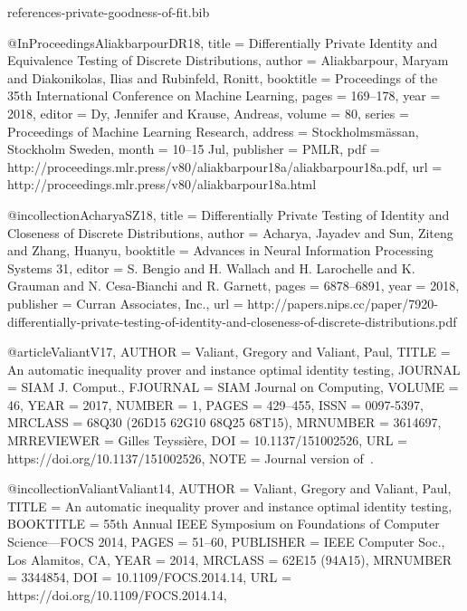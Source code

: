 \documentclass[10pt]{article}
\begin{document}
\begin{filecontents}{references-private-goodness-of-fit.bib}

@InProceedings{AliakbarpourDR18,
  title = 	 {Differentially Private Identity and Equivalence Testing of Discrete Distributions},
  author = 	 {Aliakbarpour, Maryam and Diakonikolas, Ilias and Rubinfeld, Ronitt},
  booktitle = 	 {Proceedings of the 35th International Conference on Machine Learning},
  pages = 	 {169--178},
  year = 	 {2018},
  editor = 	 {Dy, Jennifer and Krause, Andreas},
  volume = 	 {80},
  series = 	 {Proceedings of Machine Learning Research},
  address = 	 {Stockholmsmässan, Stockholm Sweden},
  month = 	 {10--15 Jul},
  publisher = 	 {PMLR},
  pdf = 	 {http://proceedings.mlr.press/v80/aliakbarpour18a/aliakbarpour18a.pdf},
  url = 	 {http://proceedings.mlr.press/v80/aliakbarpour18a.html}
}

@incollection{AcharyaSZ18,
  title = {Differentially Private Testing of Identity and Closeness of Discrete Distributions},
  author = {Acharya, Jayadev and Sun, Ziteng and Zhang, Huanyu},
  booktitle = {Advances in Neural Information Processing Systems 31},
  editor = {S. Bengio and H. Wallach and H. Larochelle and K. Grauman and N. Cesa-Bianchi and R. Garnett},
  pages = {6878--6891},
  year = {2018},
  publisher = {Curran Associates, Inc.},
  url = {http://papers.nips.cc/paper/7920-differentially-private-testing-of-identity-and-closeness-of-discrete-distributions.pdf}
}

@article{ValiantV17,
    AUTHOR = {Valiant, Gregory and Valiant, Paul},
     TITLE = {An automatic inequality prover and instance optimal identity
              testing},
   JOURNAL = {SIAM J. Comput.},
  FJOURNAL = {SIAM Journal on Computing},
    VOLUME = {46},
      YEAR = {2017},
    NUMBER = {1},
     PAGES = {429--455},
      ISSN = {0097-5397},
   MRCLASS = {68Q30 (26D15 62G10 68Q25 68T15)},
  MRNUMBER = {3614697},
MRREVIEWER = {Gilles Teyssi\`ere},
       DOI = {10.1137/151002526},
       URL = {https://doi.org/10.1137/151002526},
      NOTE = {Journal version of~\cite{ValiantValiant14}.}
}

@incollection{ValiantValiant14,
    AUTHOR = {Valiant, Gregory and Valiant, Paul},
     TITLE = {An automatic inequality prover and instance optimal identity
              testing},
 BOOKTITLE = {55th {A}nnual {IEEE} {S}ymposium on {F}oundations of
              {C}omputer {S}cience---{FOCS} 2014},
     PAGES = {51--60},
 PUBLISHER = {IEEE Computer Soc., Los Alamitos, CA},
      YEAR = {2014},
   MRCLASS = {62E15 (94A15)},
  MRNUMBER = {3344854},
       DOI = {10.1109/FOCS.2014.14},
       URL = {https://doi.org/10.1109/FOCS.2014.14},
}


\end{filecontents}
\end{document}
